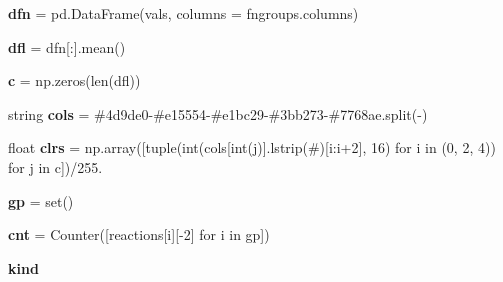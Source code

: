 \begin{DoxyCompactItemize}
{\bfseries dfn} = pd.\+Data\+Frame(vals, columns = fngroups.\+columns)
\item 
\mbox{\label{namespacedsmacc_1_1parsekpp_1_1functional__group__diff_a62b5fbb31b5ea85bb4380cbdbaeb8d24}} 
{\bfseries dfl} = dfn\mbox{[}\+:\mbox{]}.mean()
\item 
\mbox{\label{namespacedsmacc_1_1parsekpp_1_1functional__group__diff_aa1d3f70077ba00cc87dd2913b87405d6}} 
{\bfseries c} = np.\+zeros(len(dfl))
\item 
\mbox{\label{namespacedsmacc_1_1parsekpp_1_1functional__group__diff_a28aed1c9118524545459cfbf9e9a67d0}} 
string {\bfseries cols} = \textquotesingle{}\#4d9de0-\/\#e15554-\/\#e1bc29-\/\#3bb273-\/\#7768ae\textquotesingle{}.\+split(\textquotesingle{}-\/\textquotesingle{})
\item 
\mbox{\label{namespacedsmacc_1_1parsekpp_1_1functional__group__diff_aed1d940a35d263e5cd77c5748c102c73}} 
float {\bfseries clrs} = np.\+array(\mbox{[}tuple(int(cols\mbox{[}int(j)\mbox{]}.lstrip(\textquotesingle{}\#\textquotesingle{})\mbox{[}i\+:i+2\mbox{]}, 16) for i in (0, 2, 4)) for j in c\mbox{]})/255.
\item 
\mbox{\label{namespacedsmacc_1_1parsekpp_1_1functional__group__diff_a3e6ee7ebb80818c166bc86b1e197e7a0}} 
{\bfseries gp} = set()
\item 
\mbox{\label{namespacedsmacc_1_1parsekpp_1_1functional__group__diff_a96bd3731b04f23153b3f059174852631}} 
{\bfseries cnt} = Counter(\mbox{[}reactions\mbox{[}i\mbox{]}\mbox{[}-\/2\mbox{]} for i in gp\mbox{]})
\item 
\mbox{\label{namespacedsmacc_1_1parsekpp_1_1functional__group__diff_a24ee4111390157b511b675aa0f4c3cc2}} 
{\bfseries kind}
\item 
\mbox{\label{namespacedsmacc_1_1parsekpp_1_1functional__group__diff_a0c0fba8ecc8603a57476bf08ccf9287e}} 

\end{DoxyCompactItemize}
